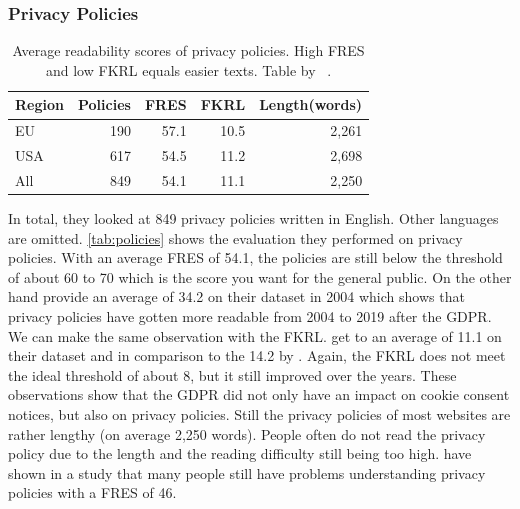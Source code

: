 \subsubsection{Privacy Policies}
\label{subsub:priv}

\begin{table}
    \begin{tabular}{ l r r r r }
        \hline
        Region & Policies & FRES & FKRL & Length(words) \\
        \hline
        EU & 190 & 57.1 & 10.5 & 2,261 \\
        USA & 617 & 54.5 & 11.2 & 2,698 \\
        All & 849 & 54.1 & 11.1 & 2,250 \\
        \hline
    \end{tabular}
    \caption{Average readability scores of privacy policies. High FRES and low FKRL equals easier texts. Table by
    \citeauthor{sanchez2019can}~\cite[Tab.~5]{sanchez2019can}.}
    \label{tab:policies}
\end{table}

In total, they looked at 849 privacy policies written in English. Other languages are omitted.
\autoref{tab:policies} shows the evaluation they performed on privacy policies. With an average FRES of 54.1, the
policies are still below the threshold of about 60 to 70 which is the score you want for the general public. On the
other hand  provide an average of 34.2 on their dataset in 2004 which shows that privacy policies
have gotten more readable from 2004 to 2019 after the GDPR. We can make the same observation with the FKRL. \citeauthor{sanchez2019can} get to an average
of 11.1 on their dataset and in comparison to the 14.2 by . Again, the FKRL does not meet the
ideal threshold of about 8, but it still improved over the years. These observations show that the GDPR did not only have
an impact on cookie consent notices, but also on privacy policies. Still the privacy policies of most websites are
rather lengthy (on average 2,250 words). People often do not read the privacy policy due to the length and the
reading difficulty still being too high.  have shown in a study that many people still have
problems understanding privacy policies with a FRES of 46.

